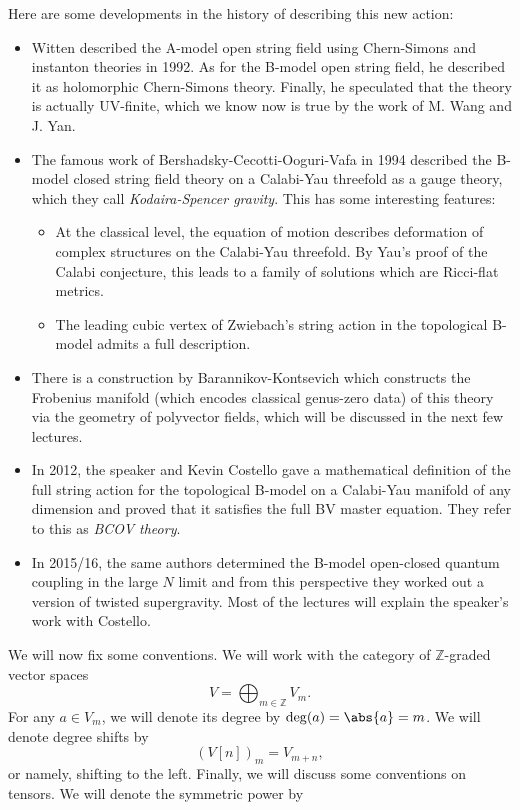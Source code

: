 \documentclass{amsart}
\theoremstyle{definition}
\theoremstyle{remark}
\theoremstyle{plain}
\theoremstyle{definition}
\theoremstyle{remark}
\newcommand{\Z}{\mathbb{Z}}
\newcommand{\1}{\mathbf{1}}
\newcommand{\2}{\mathbf{2}}
\newcommand{\3}{\mathbf{3}}
\begin{document}
Here are some developments in the history of describing this new action:
\begin{itemize}
    \item Witten described the A-model open string field using Chern-Simons and instanton theories in 1992. As for the B-model open string field, he described it as holomorphic Chern-Simons theory. Finally, he speculated that the theory is actually UV-finite, which we know now is true by the work of M. Wang and J. Yan.
    \item The famous work of Bershadsky-Cecotti-Ooguri-Vafa in 1994 described the B-model closed string field theory on a Calabi-Yau threefold as a gauge theory, which they call \textit{Kodaira-Spencer gravity}. This has some interesting features:
    \begin{itemize}
        \item At the classical level, the equation of motion describes deformation of complex structures on the Calabi-Yau threefold. By Yau's proof of the Calabi conjecture, this leads to a family of solutions which are Ricci-flat metrics.
        \item The leading cubic vertex of Zwiebach's string action in the topological B-model admits a full description.
    \end{itemize}
    \item There is a construction by Barannikov-Kontsevich which constructs the Frobenius manifold (which encodes classical genus-zero data) of this theory via the geometry of polyvector fields, which will be discussed in the next few lectures.
    \item In 2012, the speaker and Kevin Costello gave a mathematical definition of the full string action for the topological B-model on a Calabi-Yau manifold of any dimension and proved that it satisfies the full BV master equation. They refer to this as \textit{BCOV theory}.
    \item In 2015/16, the same authors determined the B-model open-closed quantum coupling in the large \(N\) limit and from this perspective they worked out a version of twisted supergravity. Most of the lectures will explain the speaker's work with Costello.
\end{itemize}
    We will now fix some conventions. We will work with the category of \(\Z\)-graded vector spaces
    \[ V = \bigoplus_{m \in \Z} V_m. \]
    For any \(a \in V_m\), we will denote its degree by \(\deg(a) = \abs{a} = m\). We will denote degree shifts by
    \[ (V[n])_m = V_{m+n}, \]
    or namely, shifting to the left. Finally, we will discuss some conventions on tensors. We will denote the symmetric power by
\end{document}
